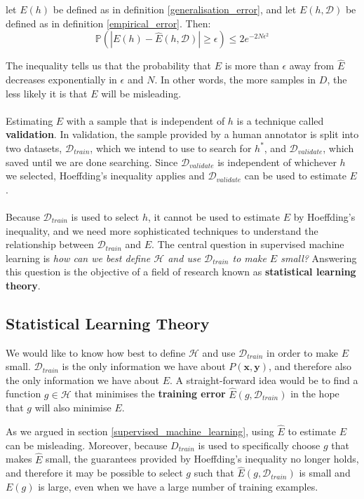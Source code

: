 \begin{theorem}
	let $E(h)$ be defined as in definition \ref{generalisation_error}, and let $E(h, \mathcal{D})$ be defined as in definition \ref{empirical_error}. Then:
	$$
	\mathbb{P}\left( |E(h) - \hat{E}(h, \mathcal{D})| \geq \epsilon \right) \leq 2e^{-2N\epsilon^2}
	$$
\end{theorem}

The inequality tells us that the probability that $E$ is more than $\epsilon$ away from $\hat{E}$ decreases exponentially in $\epsilon$ and $N$. In other words, the more samples in $D$, the less likely it is that $E$ will be misleading.
\\\\
Estimating $E$ with a sample that is independent of $h$ is a technique called \textbf{validation}. In validation, the sample provided by a human annotator is split into two datasets, $\mathcal{D}_{train}$, which we intend to use to search for $h^*$, and $\mathcal{D}_{validate}$, which saved until we are done searching. Since $\mathcal{D}_{validate}$ is independent of whichever $h$ we selected, Hoeffding's inequality applies and $\mathcal{D}_{validate}$ can be used to estimate $E$.
\\\\
Because $\mathcal{D}_{train}$ is used to select $h$, it cannot be used to estimate $E$ by Hoeffding's inequality, and we need more sophisticated techniques to understand the relationship between $\mathcal{D}_{train}$ and $E$. The central question in supervised machine learning is \textit{how can we best define $\mathcal{H}$ and use $\mathcal{D}_{train}$ to make $E$ small?} Answering this question is the objective of a field of research known as \textbf{statistical learning theory}.

\subsection{Statistical Learning Theory}
\label{statistical_learning_theory}
We would like to know how best to define $\mathcal{H}$ and use $\mathcal{D}_{train}$ in order to make $E$ small. $\mathcal{D}_{train}$ is the only information we have about $P(\mathbf{x}, \mathbf{y})$, and therefore also the only information we have about $E$. A straight-forward idea would be to find a function $g \in \mathcal{H}$ that minimises the \textbf{training error} $\hat{E}(g, \mathcal{D}_{train})$ in the hope that $g$ will also minimise $E$. 

As we argued in section \ref{supervised_machine_learning}, using $\hat{E}$ to estimate $E$ can be misleading. Moreover, because $D_{train}$ is used to specifically choose $g$ that makes $\hat{E}$ small, the guarantees provided by Hoeffding's inequality no longer holds, and therefore it may be possible to select $g$ such that $\hat{E}(g, \mathcal{D}_{train})$ is small and $E(g)$ is large, even when we have a large number of training examples.


